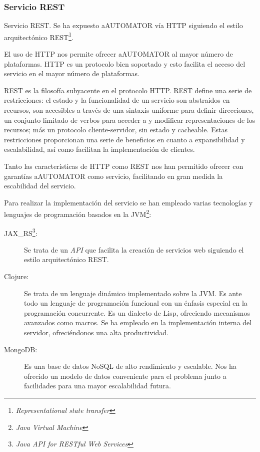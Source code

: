 \subsubsection{Servicio REST}

Servicio REST. Se ha expuesto aAUTOMATOR vía HTTP siguiendo el estilo
arquitectónico REST\cite{REST}\footnote{\emph{Representational state
    transfer}}.

El uso de HTTP nos permite ofrecer aAUTOMATOR al mayor número de
plataformas. HTTP es un protocolo bien soportado y esto facilita el
acceso del servicio en el mayor número de plataformas.

REST es la filosofía subyacente en el protocolo HTTP. REST define una
serie de restricciones: el estado y la funcionalidad de un servicio
son abstraídos en recursos, son accesibles a través de una sintaxis
uniforme para definir direcciones, un conjunto limitado de verbos para
acceder a y modificar representaciones de los recursos; más un
protocolo cliente-servidor, sin estado y cacheable.  Estas
restricciones proporcionan una serie de beneficios en cuanto a
expansibilidad y escalabilidad, así como facilitan la implementación
de clientes.

Tanto las características de HTTP como REST nos han permitido ofrecer
con garantías aAUTOMATOR como servicio, facilitando en gran medida la
escabilidad del servicio.

Para realizar la implementación del servicio se han empleado varias
tecnologías y lenguajes de programación basados en la
JVM\footnote{\emph{Java Virtual Machine}}:
\begin{description}
\item[JAX\_RS\cite{JAXRS}\footnote{\emph{Java API for RESTful Web
      Services}}:] Se trata de un \emph{API} que facilita la creación
  de servicios web siguiendo el estilo arquitectónico REST.
\item[Clojure\cite{JOY}:] Se trata de un lenguaje dinámico
  implementado sobre la JVM. Es ante todo un lenguaje de programación
  funcional\cite{FUNCTIONAL} con un énfasis especial en la
  programación concurrente. Es un dialecto de Lisp\cite{LISP},
  ofreciendo mecanismos avanzados como macros. Se ha empleado en la
  implementación interna del servidor, ofreciéndonos una alta
  productividad.
\item[MongoDB\cite{MONGO}:] Es una base de datos NoSQL\cite{NOSQL} de
  alto rendimiento y escalable. Nos ha ofrecido un modelo de datos
  conveniente para el problema junto a facilidades para una mayor
  escalabilidad futura.
\end{description}

